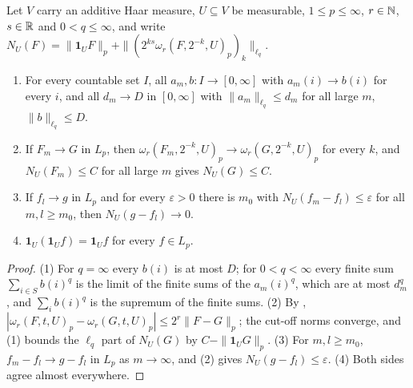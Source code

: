\begin{lemma}
\label{lem:besov-norm-complete}
\leanok
{}
Let $V$ carry an additive Haar measure, $U \subseteq V$ be measurable, $1 \leq p \leq \infty$,
$r \in \mathbb{N}$, $s \in \mathbb{R}$ and $0 < q \leq \infty$, and write
$N_U(F) = \|\mathbf 1_U F\|_p + \|(2^{ks} \omega_r(F, 2^{-k}, U)_p)_k\|_{\ell_q}$.
\begin{enumerate}
  \item For every countable set $I$, all $a_m, b \colon I \to [0, \infty]$ with $a_m(i) \to b(i)$
    for every $i$, and all $d_m \to D$ in $[0, \infty]$ with $\|a_m\|_{\ell_q} \leq d_m$ for all
    large $m$, $\|b\|_{\ell_q} \leq D$.
  \item If $F_m \to G$ in $L_p$, then $\omega_r(F_m, 2^{-k}, U)_p \to \omega_r(G, 2^{-k}, U)_p$
    for every $k$, and $N_U(F_m) \leq C$ for all large $m$ gives $N_U(G) \leq C$.
  \item If $f_l \to g$ in $L_p$ and for every $\varepsilon > 0$ there is $m_0$ with
    $N_U(f_m - f_l) \leq \varepsilon$ for all $m, l \geq m_0$, then $N_U(g - f_l) \to 0$.
  \item $\mathbf 1_U (\mathbf 1_U f) = \mathbf 1_U f$ for every $f \in L_p$.
\end{enumerate}
\end{lemma}

\begin{proof}
\leanok
(1) For $q = \infty$ every $b(i)$ is at most $D$; for $0 < q < \infty$ every finite sum
$\sum_{i \in S} b(i)^q$ is the limit of the finite sums of the $a_m(i)^q$, which are at most
$d_m^q$, and $\sum_i b(i)^q$ is the supremum of the finite sums. (2) By
, $|\omega_r(F, t, U)_p - \omega_r(G, t, U)_p| \leq 2^r \|F - G\|_p$; the
cut-off norms converge, and (1) bounds the $\ell_q$ part of $N_U(G)$ by
$C - \|\mathbf 1_U G\|_p$. (3) For $m, l \geq m_0$, $f_m - f_l \to g - f_l$ in $L_p$ as
$m \to \infty$, and (2) gives $N_U(g - f_l) \leq \varepsilon$. (4) Both sides agree almost
everywhere.
\end{proof}

